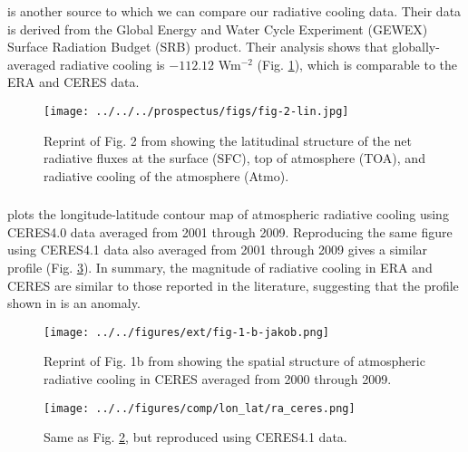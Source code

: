 \documentclass[11pt]{article}
\begin{document}
\subsubsection{\cite{lin_assessment_2008}}
\label{sec:org63a1848}
\cite{lin_assessment_2008} is another source to which we can compare our radiative cooling data. Their data is derived from the Global Energy and Water Cycle Experiment (GEWEX) Surface Radiation Budget (SRB) product. Their analysis shows that globally-averaged radiative cooling is \(-112.12\) Wm\(^{-2}\) (Fig. \ref{fig:org40e5272}), which is comparable to the ERA and CERES data.

\begin{figure}[htbp]
\centering
\texttt{[image: ../../../prospectus/figs/fig-2-lin.jpg]}
\caption{\label{fig:org40e5272}Reprint of Fig. 2 from \cite{lin_assessment_2008} showing the latitudinal structure of the net radiative fluxes at the surface (SFC), top of atmosphere (TOA), and radiative cooling of the atmosphere (Atmo).}
\end{figure}

\subsubsection{\cite{jakob_radiative_2019}}
\label{sec:orgb2fa02d}
\cite{jakob_radiative_2019} plots the longitude-latitude contour map of atmospheric radiative cooling using CERES4.0 data averaged from 2001 through 2009. Reproducing the same figure using CERES4.1 data also averaged from 2001 through 2009 gives a similar profile (Fig. \ref{fig:org7296393}). In summary, the magnitude of radiative cooling in ERA and CERES are similar to those reported in the literature, suggesting that the profile shown in \cite{hartmann_global_2016} is an anomaly.

\begin{figure}[htbp]
\centering
\texttt{[image: ../../figures/ext/fig-1-b-jakob.png]}
\caption{\label{fig:org90bf693}Reprint of Fig. 1b from \cite{jakob_radiative_2019} showing the spatial structure of atmospheric radiative cooling in CERES averaged from 2000 through 2009.}
\end{figure}

\begin{figure}[htbp]
\centering
\texttt{[image: ../../figures/comp/lon\_lat/ra\_ceres.png]}
\caption{\label{fig:org7296393}Same as Fig. \ref{fig:org90bf693}, but reproduced using CERES4.1 data.}
\end{figure}
\end{document}
